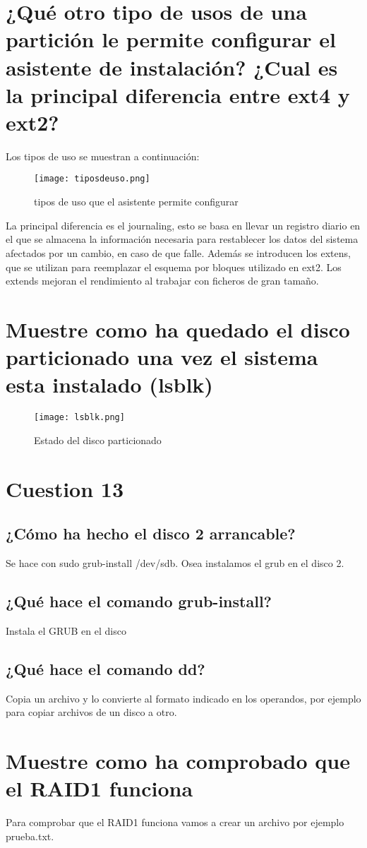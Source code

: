 \section{¿Qué otro tipo de usos de una partición le permite configurar el asistente de instalación? ¿Cual es la principal diferencia entre ext4 y ext2?}
Los tipos de uso se muestran a continuación:
\begin{figure}[H] 
\centering
\texttt{[image: tiposdeuso.png]}  
\label{figura2:}
\caption{tipos de uso que el asistente permite configurar}
\end{figure}
La principal diferencia es el journaling, esto se basa en llevar un registro diario en el que se almacena la información necesaria para restablecer los datos del sistema afectados por un cambio, en caso de que falle.
Además se introducen los extens, que se utilizan para reemplazar el esquema por bloques utilizado en ext2. Los extends mejoran el rendimiento al trabajar con ficheros de gran tamaño.
\section{Muestre como ha quedado el disco particionado una vez el sistema esta instalado (lsblk)}
\begin{figure}[H] 
\centering
\texttt{[image: lsblk.png]}  
\label{figura3:}
\caption{Estado del disco particionado}
\end{figure}
\section{Cuestion 13}
\subsection{¿Cómo ha hecho el disco 2 arrancable?}
Se hace con sudo grub-install /dev/sdb. Osea instalamos el grub en el disco 2.
\subsection{¿Qué hace el comando grub-install?}
Instala el GRUB en el disco
\subsection{¿Qué hace el comando dd?}
Copia un archivo y lo convierte al formato indicado en los operandos, por ejemplo para copiar archivos de un disco a otro.
\section{ Muestre como ha comprobado que el RAID1 funciona}
Para comprobar que el RAID1 funciona vamos a crear un archivo por ejemplo prueba.txt.


